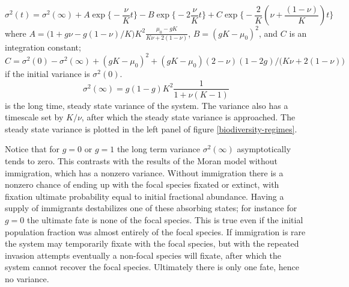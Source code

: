 \begin{equation}
 \sigma^2(t) = \sigma^2(\infty) + A\exp\Bigg\{-\frac{\nu}{K}t\Bigg\} - B\exp\Bigg\{-2\frac{\nu}{K}t\Bigg\} + C\exp\Bigg\{-\frac{2}{K}\left(\nu+\frac{(1-\nu)}{K}\right)t\Bigg\}
\end{equation}
where $A=\big(1+g\nu-g(1-\nu)/K\big)K^2\frac{\mu_0-gK}{K\nu+2(1-\nu)}$, $B=(gK-\mu_0)^2$, and $C$ is an integration constant; $C = \sigma^2(0) - \sigma^2(\infty) + (gK-\mu_0)^2 + (gK-\mu_0)(2-\nu)(1-2g)/\big(K\nu+2(1-\nu)\big)$ if the initial variance is $\sigma^2(0)$. 
\begin{equation}
\sigma^2(\infty) = g(1-g) K^2\frac{1}{1+\nu(K-1)}
\end{equation}
is the long time, steady state variance of the system. 
The variance also has a timescale set by $K/\nu$, after which the steady state variance is approached. 
The steady state variance is plotted in the left panel of figure \ref{biodiversity-regimes}. 


Notice that for $g=0$ or $g=1$ the long term variance $\sigma^2(\infty)$ asymptotically tends to zero. 
This contrasts with the results of the Moran model without immigration, which has a nonzero variance. 
Without immigration there is a nonzero chance of ending up with the focal species fixated or extinct, with fixation ultimate probability equal to initial fractional abundance. 
Having a supply of immigrants destabilizes one of these absorbing states; for instance for $g=0$ the ultimate fate is none of the focal species. %
This is true even if the initial population fraction was almost entirely of the focal species. If immigration is rare the system may temporarily fixate with the focal species, but with the repeated invasion attempts eventually a non-focal species will fixate, after which the system cannot recover the focal species. 
Ultimately there is only one fate, hence no variance. 

